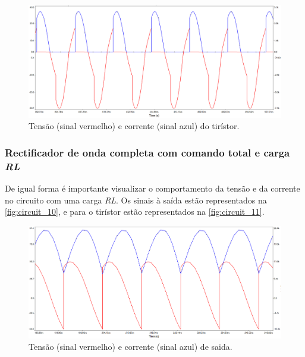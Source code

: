 \documentclass[a4paper,11pt]{article}
\numberwithin{equation}{section}
\begin{document}
\begin{figure}[h]
	\centering
	\includegraphics[keepaspectratio=true, scale=0.4]{img/circuito7}
	\caption{Tensão (sinal vermelho) e corrente (sinal azul) do tirístor.}
	\label{fig:circuit_9}
	\vspace{-0.8em}
\end{figure}

\vspace{12mm}

\subsubsection{Rectificador de onda completa com comando total e carga \textit{RL}}

De igual forma é importante visualizar o comportamento da tensão e da corrente no circuito com uma carga \textit{RL}. Os sinais à saída estão representados na \autoref{fig:circuit_10}, e para o tirístor estão representados na \autoref{fig:circuit_11}.
\pagebreak

\begin{figure}[h]
	\centering
	\includegraphics[keepaspectratio=true, scale=0.4]{img/circuito8}
	\caption{Tensão (sinal vermelho) e corrente (sinal azul) de saida.}
	\label{fig:circuit_10}
	\vspace{-0.8em}
\end{figure}
\end{document}
